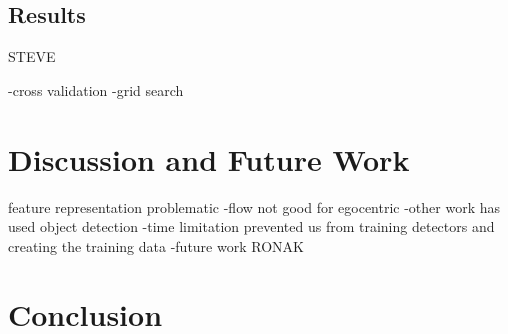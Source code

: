 \documentclass[10pt,twocolumn,letterpaper]{article}
\begin{document}
\subsection{Results}
STEVE 

-cross validation
-grid search


\section{Discussion and Future Work}

feature representation problematic
-flow not good for egocentric
-other work has used object detection
	-time limitation prevented us from training detectors and creating the training data
	-future work
RONAK

\section{Conclusion}



{\small


}
\end{document}
